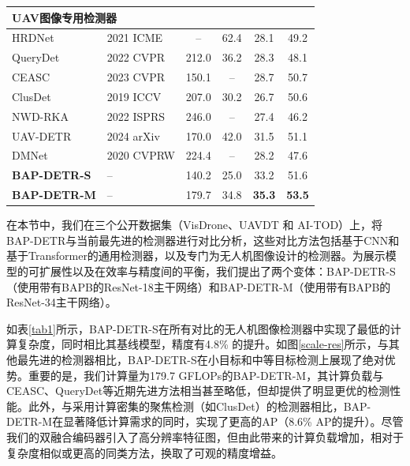 \begin{table}[t]
\begin{tabular*}{0.9\textwidth}{@{\extracolsep{\fill}}llcccc}
    \midrule
    \multicolumn{6}{l}{UAV图像专用检测器} \\
    \midrule
    HRDNet \cite{Liu2021HRDNet} & 2021 ICME & -- & 62.4 & 28.1 & 49.2 \\
    QueryDet \cite{Yang2022QueryDet} & 2022 CVPR & 212.0 & 36.2 & 28.3 & 48.1 \\
    CEASC \cite{Du2023CEASC} & 2023 CVPR & 150.1 & -- & 28.7 & 50.7 \\
    ClusDet \cite{Yang2019ClusteredOD} & 2019 ICCV & 207.0 & 30.2 & 26.7 & 50.6 \\
    NWD-RKA \cite{Xu2022NWD} & 2022 ISPRS & 246.0 & -- & 27.4 & 46.2 \\
    UAV-DETR \cite{Zhang2025UAVDETR} & 2024 arXiv & 170.0 & 42.0 & 31.5 & 51.1 \\
    DMNet \cite{Li2020DMNet} & 2020 CVPRW & 224.4 & -- & 28.2 & 47.6 \\
    \midrule
    \textbf{BAP-DETR-S} & -- & 140.2 & 25.0 & 33.2 & 51.6 \\
    \textbf{BAP-DETR-M} & -- & 179.7 & 34.8 & \textbf{35.3} & \textbf{53.5} \\
    \bottomrule
  \end{tabular*}
\end{table}

在本节中，我们在三个公开数据集（VisDrone、UAVDT 和 AI-TOD）上，将BAP-DETR与当前最先进的检测器进行对比分析，这些对比方法包括基于CNN和基于Transformer的通用检测器，以及专门为无人机图像设计的检测器。为展示模型的可扩展性以及在效率与精度间的平衡，我们提出了两个变体：BAP-DETR-S（使用带有BAPB的ResNet-18主干网络）和BAP-DETR-M（使用带有BAPB的ResNet-34主干网络）。

如表\ref{tab1}所示，BAP-DETR-S在所有对比的无人机图像检测器中实现了最低的计算复杂度，同时相比其基线模型，精度有4.8\% 的提升。如图\ref{scale-res}所示，与其他最先进的检测器相比，BAP-DETR-S在小目标和中等目标检测上展现了绝对优势。重要的是，我们计算量为179.7 GFLOPs的BAP-DETR-M，其计算负载与CEASC、QueryDet等近期先进方法相当甚至略低，但却提供了明显更优的检测性能。此外，与采用计算密集的聚焦检测（如ClusDet）的检测器相比，BAP-DETR-M在显著降低计算需求的同时，实现了更高的AP（8.6\% AP的提升）。尽管我们的双融合编码器引入了高分辨率特征图，但由此带来的计算负载增加，相对于复杂度相似或更高的同类方法，换取了可观的精度增益。

